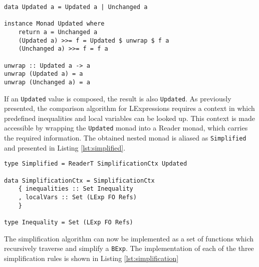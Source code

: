\documentclass[12pt]{article}
\begin{document}
\begin{lstlisting}[style=c0, caption=the Updated monad, label=lst:updated]
data Updated a = Updated a | Unchanged a

instance Monad Updated where
    return a = Unchanged a
    (Updated a) >>= f = Updated $ unwrap $ f a
    (Unchanged a) >>= f = f a

unwrap :: Updated a -> a
unwrap (Updated a) = a
unwrap (Unchanged a) = a
\end{lstlisting}

If an \texttt{Updated} value is composed, the result is also \texttt{Updated}.
As previously presented, the comparison algorithm for LExpressions requires a context in which predefined inequalities and local variables can be looked up.
This context is made accessible by wrapping the \texttt{Updated} monad into a Reader monad, which carries the required information.
The obtained nested monad is aliased as \texttt{Simplified} and presented in Listing \ref{lst:simplified}.

\begin{lstlisting}[style=c0, caption=the Simplified monad, label=lst:simplified]
type Simplified = ReaderT SimplificationCtx Updated

data SimplificationCtx = SimplificationCtx 
    { inequalities :: Set Inequality
    , localVars :: Set (LExp FO Refs)
    }
    
type Inequality = Set (LExp FO Refs)
\end{lstlisting}

The simplification algorithm can now be implemented as a set of functions which recursively traverse and simplify a \texttt{BExp}.
The implementation of each of the three simplification rules is shown in Listing \ref{lst:simplification}
\end{document}
